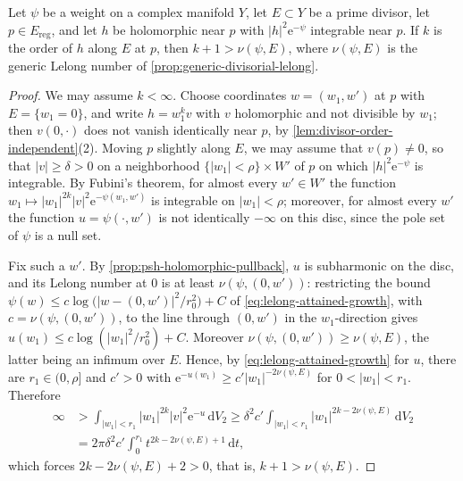 \begin{lemma}\label{lem:divisorial-slice-bound}
Let $\psi$ be a weight on a complex manifold $Y$, let $E\subset Y$ be a prime divisor, let $p\in E_{\mathrm{reg}}$, and let $h$ be holomorphic near $p$ with $|h|^2\mathrm e^{-\psi}$ integrable near $p$. If $k$ is the order of $h$ along $E$ at $p$, then $k+1>\nu(\psi,E)$, where $\nu(\psi,E)$ is the generic Lelong number of \cref{prop:generic-divisorial-lelong}.
\end{lemma}
\begin{proof}
We may assume $k<\infty$. Choose coordinates $w=(w_1,w')$ at $p$ with $E=\{w_1=0\}$, and write $h=w_1^kv$ with $v$ holomorphic and not divisible by $w_1$; then $v(0,\cdot)$ does not vanish identically near $p$, by \cref{lem:divisor-order-independent}(2). Moving $p$ slightly along $E$, we may assume that $v(p)\neq0$, so that $|v|\geq\delta>0$ on a neighborhood $\{|w_1|<\rho\}\times W'$ of $p$ on which $|h|^2\mathrm e^{-\psi}$ is integrable. By Fubini's theorem, for almost every $w'\in W'$ the function $w_1\mapsto|w_1|^{2k}|v|^2\mathrm e^{-\psi(w_1,w')}$ is integrable on $|w_1|<\rho$; moreover, for almost every $w'$ the function $u=\psi(\cdot,w')$ is not identically $-\infty$ on this disc, since the pole set of $\psi$ is a null set.

Fix such a $w'$. By \cref{prop:psh-holomorphic-pullback}, $u$ is subharmonic on the disc, and its Lelong number at $0$ is at least $\nu(\psi,(0,w'))$: restricting the bound $\psi(w)\leq c\log\bigl(|w-(0,w')|^2/r_0^2\bigr)+C$ of \eqref{eq:lelong-attained-growth}, with $c=\nu(\psi,(0,w'))$, to the line through $(0,w')$ in the $w_1$-direction gives $u(w_1)\leq c\log(|w_1|^2/r_0^2)+C$. Moreover $\nu(\psi,(0,w'))\geq\nu(\psi,E)$, the latter being an infimum over $E$. Hence, by \eqref{eq:lelong-attained-growth} for $u$, there are $r_1\in(0,\rho]$ and $c'>0$ with $\mathrm e^{-u(w_1)}\geq c'|w_1|^{-2\nu(\psi,E)}$ for $0<|w_1|<r_1$. Therefore
\[
 \begin{aligned}
 \infty&>\int_{|w_1|<r_1}|w_1|^{2k}|v|^2\mathrm e^{-u}\,\mathrm dV_2
 \geq\delta^2c'\int_{|w_1|<r_1}|w_1|^{2k-2\nu(\psi,E)}\,\mathrm dV_2\\
 &=2\pi\delta^2c'\int_0^{r_1}t^{2k-2\nu(\psi,E)+1}\,\mathrm dt,
 \end{aligned}
\]
which forces $2k-2\nu(\psi,E)+2>0$, that is, $k+1>\nu(\psi,E)$.
\end{proof}

